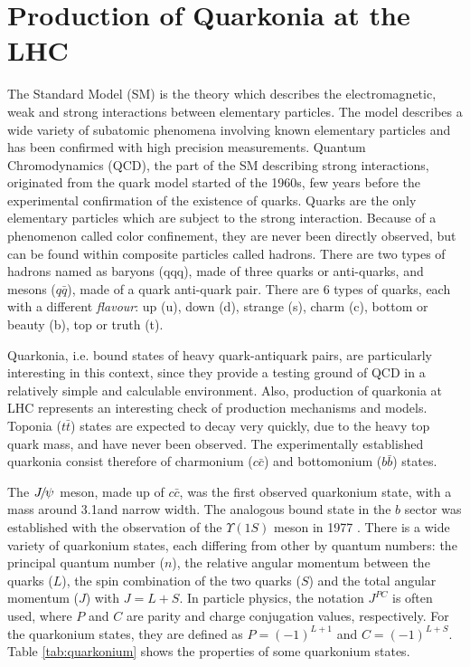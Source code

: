 \chapter{Production of Quarkonia at the LHC}
\label{sec:review}
The Standard Model (SM) is the theory which describes the electromagnetic, weak
and strong interactions between elementary particles. The model describes a
wide variety of subatomic phenomena involving known elementary particles and
has been confirmed with high precision measurements. Quantum Chromodynamics 
(QCD), the part of the SM describing strong interactions, originated from 
the quark model started of the 1960s\cite{GellMann:1964nj,Zweig:1981pd}, few
years before the experimental confirmation of the existence of quarks. Quarks are 
the only elementary particles which are subject to the strong interaction. 
Because of a phenomenon called color confinement, they are
never been directly observed,  but can be found within composite particles
called hadrons. There are two types of hadrons named as baryons (qqq), made of
three quarks or anti-quarks, and mesons ($q\bar{q}$), made of a quark 
anti-quark pair. There are 6 types of quarks, each with a different {\em{flavour}}: 
up (u), down (d), strange (s), charm (c), bottom or beauty (b), top or
truth (t).

Quarkonia, i.e. bound states of heavy quark-antiquark pairs, are
particularly interesting in this context, since they provide a testing ground
of QCD in a relatively simple and calculable environment. Also, production of
quarkonia at LHC represents an interesting check of production mechanisms and
models. Toponia ($t\bar{t}$) states are expected to decay very quickly, due to
the heavy top quark mass, and have never been observed. The experimentally
established quarkonia consist therefore of charmonium ($c\bar{c}$) and
bottomonium ($b\bar{b}$) states.

The ${{J\mskip -3mu/\mskip -2mu\psi\mskip 2mu}}$ meson, made up of $c\bar{c}$, was the first observed quarkonium
state\cite{PhysRevLett.33.1404}, with a mass around 3.1\gev and narrow width. The analogous 
bound state in the $b$ sector was established with the observation of the 
$\Upsilon(1S)$ meson in 1977 \cite{Herb:1977ek}. 
There is a wide variety of quarkonium states, each differing from other by quantum
numbers: the principal quantum number ($n$), the relative angular momentum
between the quarks ($L$), the spin combination of the two quarks ($S$) and the total
angular momentum ($J$) with $J = L + S$. In particle physics, the notation $J^{PC}$ is
often used, where $P$ and $C$ are parity and charge conjugation values, respectively.
For the quarkonium states, they are defined as $P=(-1)^{L+1}$ and $C=(-1)^{L+S}$.
Table \ref{tab:quarkonium} shows the properties of some quarkonium states. 

